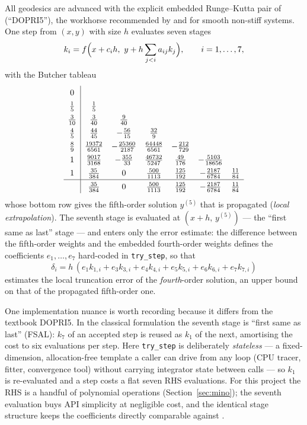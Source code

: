All geodesics are advanced with the explicit embedded Runge--Kutta pair
of \citet{DormandPrince1980} (``DOPRI5''), the workhorse recommended by
\citet{HairerNorsettWanner1993} and \citet{PressNR2007} for smooth
non-stiff systems. One step from $(x, y)$ with size $h$ evaluates seven
stages
\begin{equation}
k_i = f\Bigl(x + c_i h,\ y + h\sum_{j<i} a_{ij}k_j\Bigr),
\qquad i = 1,\dots,7,
\end{equation}
with the Butcher tableau
\begin{equation}
\renewcommand{\arraystretch}{1.35}
\begin{array}{c|cccccc}
0 & & & & & & \\
\frac15 & \frac15 & & & & & \\
\frac{3}{10} & \frac{3}{40} & \frac{9}{40} & & & & \\
\frac45 & \frac{44}{45} & -\frac{56}{15} & \frac{32}{9} & & & \\
\frac89 & \frac{19372}{6561} & -\frac{25360}{2187} & \frac{64448}{6561}
        & -\frac{212}{729} & & \\
1 & \frac{9017}{3168} & -\frac{355}{33} & \frac{46732}{5247}
  & \frac{49}{176} & -\frac{5103}{18656} & \\
1 & \frac{35}{384} & 0 & \frac{500}{1113} & \frac{125}{192}
  & -\frac{2187}{6784} & \frac{11}{84} \\
\hline
 & \frac{35}{384} & 0 & \frac{500}{1113} & \frac{125}{192}
  & -\frac{2187}{6784} & \frac{11}{84}
\end{array}
\label{eq:butcher}
\end{equation}
whose bottom row gives the fifth-order solution $y^{(5)}$ that is
propagated (\emph{local extrapolation}). The seventh stage is evaluated
at $(x+h,\,y^{(5)})$ — the ``first same as last'' stage — and enters only
the error estimate: the difference between the fifth-order weights and
the embedded fourth-order weights defines the coefficients
$e_1,\dots,e_7$ hard-coded in \texttt{try\_step}, so that
\begin{equation}
\delta_i = h\,(e_1 k_{1,i} + e_3 k_{3,i} + e_4 k_{4,i}
 + e_5 k_{5,i} + e_6 k_{6,i} + e_7 k_{7,i})
\end{equation}
estimates the local truncation error of the \emph{fourth}-order
solution, an upper bound on that of the propagated fifth-order one.

One implementation nuance is worth recording because it differs from
the textbook DOPRI5. In the classical formulation the seventh stage is
``first same as last'' (FSAL): $k_7$ of an accepted step is reused as
$k_1$ of the next, amortising the cost to six evaluations per step.
Here \texttt{try\_step} is deliberately \emph{stateless} — a
fixed-dimension, allocation-free template a caller can drive from any
loop (CPU tracer, fitter, convergence tool) without carrying integrator
state between calls — so $k_1$ is re-evaluated and a step costs a flat
seven RHS evaluations. For this project the RHS is a handful of
polynomial operations (Section~\ref{sec:mino}); the seventh evaluation
buys API simplicity at negligible cost, and the identical stage
structure keeps the coefficients directly comparable against
\citet{DormandPrince1980}.

